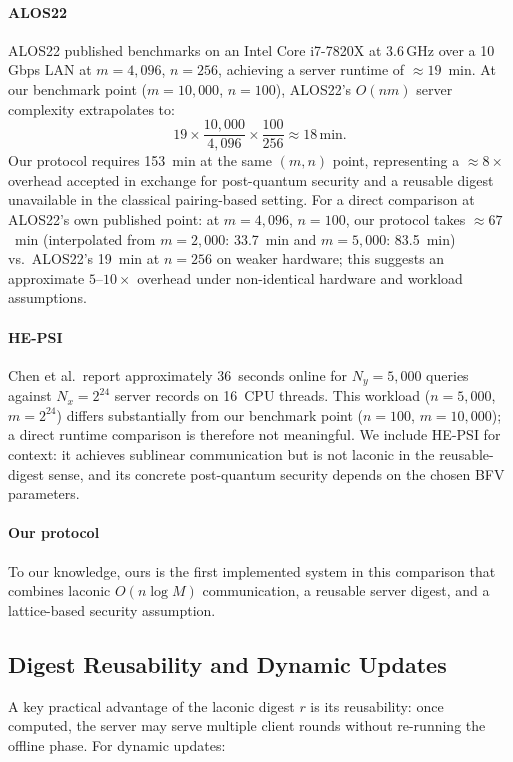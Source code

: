 \documentclass[preprint,12pt]{elsarticle}
\begin{document}
\paragraph{ALOS22~\cite{alos2022}}
ALOS22 published benchmarks on an Intel Core i7-7820X at 3.6\,GHz over a
10\,Gbps LAN at $m = 4{,}096$, $n = 256$, achieving a server runtime of
$\approx 19$~min. At our benchmark point ($m=10{,}000$, $n=100$), ALOS22's
$O(nm)$ server complexity extrapolates to:
\[
  19 \times \frac{10{,}000}{4{,}096} \times \frac{100}{256} \approx 18\,\text{min.}
\]
Our protocol requires 153~min at the same $(m, n)$ point, representing a $\approx 8\times$
overhead accepted in exchange for post-quantum security and a reusable digest
unavailable in the classical pairing-based setting. For a direct comparison at
ALOS22's own published point: at $m=4{,}096$, $n=100$, our protocol takes
$\approx 67$~min (interpolated from $m=2{,}000$: 33.7~min and
$m=5{,}000$: 83.5~min) vs.\ ALOS22's 19~min at $n=256$ on weaker
hardware; this suggests an approximate $5$--$10\times$ overhead under
non-identical hardware and workload assumptions.

\paragraph{HE-PSI~\cite{chen2017fast}}
Chen et al.\ report approximately 36~seconds online for $N_y = 5{,}000$
queries against $N_x = 2^{24}$ server records on 16~CPU threads. This
workload ($n = 5{,}000$, $m = 2^{24}$) differs substantially from our
benchmark point ($n = 100$, $m = 10{,}000$); a direct runtime comparison
is therefore not meaningful. We include HE-PSI for context: it achieves
sublinear communication but is not laconic in the reusable-digest sense,
and its concrete post-quantum security depends on the chosen BFV
parameters.

\paragraph{Our protocol}
To our knowledge, ours is the first implemented system in this comparison
that combines laconic $O(n \log M)$ communication, a reusable server digest,
and a lattice-based security assumption.

\subsection{Digest Reusability and Dynamic Updates}
\label{subsec:dynamic}

A key practical advantage of the laconic digest $r$ is its reusability: once
computed, the server may serve multiple client rounds without re-running the
offline phase. For dynamic updates:
\end{document}
